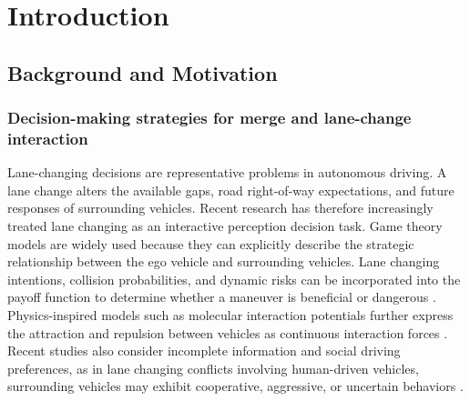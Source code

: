 \uomstartmainbody

\section{Introduction}



\subsection{Background and Motivation}



\subsubsection{Decision-making strategies for merge and lane-change interaction}





Lane-changing decisions are representative problems in autonomous driving. A lane change alters the available gaps, road right-of-way expectations, and future responses of surrounding vehicles. Recent research has therefore increasingly treated lane changing as an interactive perception decision task. Game theory models are widely used because they can explicitly describe the strategic relationship between the ego vehicle and surrounding vehicles. Lane changing intentions, collision probabilities, and dynamic risks can be incorporated into the payoff function to determine whether a maneuver is beneficial or dangerous \cite{R1,R2}. Physics-inspired models such as molecular interaction potentials further express the attraction and repulsion between vehicles as continuous interaction forces \cite{R3}. Recent studies also consider incomplete information and social driving preferences, as in lane changing conflicts involving human-driven vehicles, surrounding vehicles may exhibit cooperative, aggressive, or uncertain behaviors \cite{R4}.



